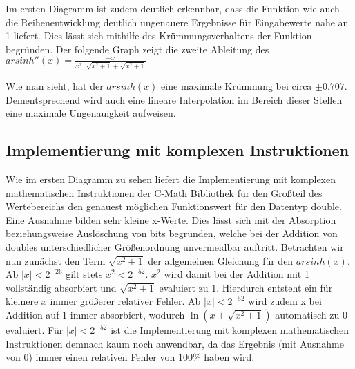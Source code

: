 \documentclass[course=erap] {aspdoc}
\begin{document}
     Im ersten Diagramm ist zudem deutlich erkennbar, dass die Funktion wie auch die Reihenentwicklung deutlich ungenauere Ergebnisse für Eingabewerte nahe an 1 liefert. Dies lässt sich mithilfe des Krümmungsverhaltens der Funktion begründen. Der folgende Graph zeigt die zweite Ableitung des $arsinh''(x) = \frac{-x}{x^2\cdot \sqrt{x^2+1}+\sqrt{x^2+1}}$
 
     
 
     Wie man sieht, hat der $arsinh(x)$ eine maximale Krümmung bei circa $\pm 0.707$. Dementsprechend wird auch eine lineare Interpolation im Bereich dieser Stellen eine maximale Ungenauigkeit aufweisen.
     
     \subsection{Implementierung mit komplexen Instruktionen}
     Wie im ersten Diagramm zu sehen liefert die Implementierung mit komplexen mathematischen Instruktionen der C-Math Bibliothek für den Großteil des Wertebereichs den genauest möglichen Funktionswert für den Datentyp double. Eine Ausnahme bilden sehr kleine x-Werte. Dies lässt sich mit der Absorption beziehungsweise Auslöschung von bits begründen, welche bei der Addition von doubles unterschiedlicher Größenordnung unvermeidbar auftritt. Betrachten wir nun zunächst den Term $\sqrt{x^2 + 1}$ der allgemeinen Gleichung für den $arsinh(x)$. Ab $|x|<2^{-26}$ gilt stets $x^2<2^{-52}$. $x^2$ wird damit bei der Addition mit 1 vollständig absorbiert und $\sqrt{x^2 + 1}$ evaluiert zu 1. Hierdurch entsteht ein für kleinere $x$ immer größerer relativer Fehler. Ab $|x|<2^{-52}$ wird zudem x bei Addition auf 1 immer absorbiert, wodurch $\ln{(x+\sqrt{x^2 + 1})}$ automatisch zu 0 evaluiert. Für $|x|<2^{-52}$ ist die Implementierung mit komplexen mathematischen Instruktionen demnach kaum noch anwendbar, da das Ergebnis (mit Ausnahme von 0) immer einen relativen Fehler von $100\%$ haben wird.
     
\end{document}
